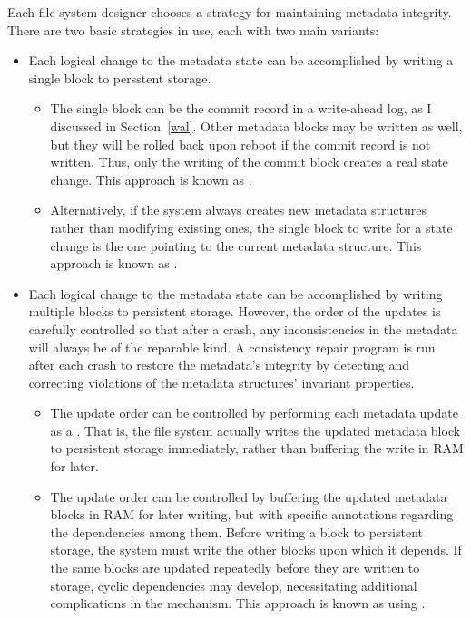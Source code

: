 Each file system designer chooses a strategy for maintaining metadata
integrity.  There are two basic strategies in use, each with two main
variants:
\begin{itemize}
\item
Each logical change to the metadata state can be accomplished by
writing a single block to persstent storage.
\begin{itemize}
\item
The single block can be the commit record in a write-ahead log, as I
discussed in Section~\ref{wal}.  Other metadata blocks may be written
as well, but they will be rolled back upon reboot if the commit record
is not written.  Thus, only the writing of the commit block creates a
real state change.  This approach is known as .
\item
Alternatively, if the system always creates new metadata structures rather than
modifying existing ones, the single block to write for a state change
is the one pointing to the current metadata structure.  This approach
is known as
.
\end{itemize}
\item
Each logical change to the metadata state can be accomplished by
writing multiple blocks to persistent storage. However, the order of the updates is
carefully controlled so that after a crash, any inconsistencies in the
metadata will always be of the reparable kind.   A
consistency repair program is run after each crash to restore
the metadata's integrity by detecting and correcting violations of the
metadata structures' invariant properties.
\begin{itemize}
\item
The update order can be controlled by performing each metadata update
as a .  That is, the file system
actually writes the updated metadata block to persistent storage immediately, rather
than buffering the write in RAM for later.
\item
The update order can be controlled by buffering the updated
metadata blocks in RAM for later writing, but with specific
annotations regarding the dependencies among them.  Before writing a block
to persistent storage, the system must write the other blocks upon which it depends.  If the same
blocks are updated repeatedly before they are written to storage, cyclic
dependencies may develop, necessitating additional complications in
the mechanism.  This approach is known as using
.
\end{itemize}
\end{itemize}

